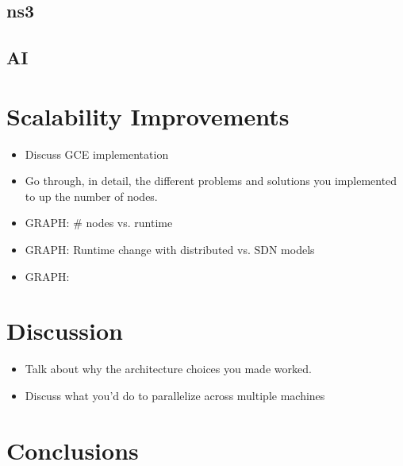\documentclass[letterpaper, 10 pt, conference]{ieeeconf}  %
\begin{document}
\subsection{ns3}
\subsection{AI}


\section{Scalability Improvements}

\begin{itemize}
    \item Discuss GCE implementation
    \item Go through, in detail, the different problems and solutions you implemented to up the number of nodes.
\end{itemize}

\begin{itemize}
    \item GRAPH: # nodes vs. runtime
    \item GRAPH: Runtime change with distributed vs. SDN models
    \item GRAPH: 
\end{itemize}

\section{Discussion}
\begin{itemize}
    \item Talk about why the architecture choices you made worked.
    \item Discuss what you'd do to parallelize across multiple machines
\end{itemize}
\section{Conclusions}
\end{document}

